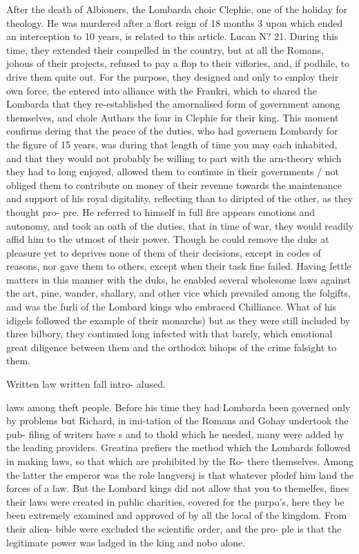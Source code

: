 \documentclass{article}
\begin{document}
After the death of Albioners, the Lombarda choic Clephie, one of the holiday for theology. He was murdered after a flort reign of 18 months 3 upon which ended an interception to 10 years, is related to this article. Lucan N? 21. During this time, they extended their compelled in the country, but at all the Romans, johous of their projects, refused to pay a flop to their viflories, and, if podhile, to drive them quite out. For the purpose, they designed and only to employ their own force, the entered into alliance with the Frankri, which to shared the Lombarda that they re-established the amornalised form of government among themselves, and chole Authars the four in Clephie for their king. This moment confirms dering that the peace of the duties, who had governem Lombardy for the figure of 15 years, was during that length of time you may each inhabited, and that they would not probably be willing to part with the arn-theory which they had to long enjoyed, allowed them to continue in their governments / not obliged them to contribute on money of their revenue towards the maintenance and support of his royal digitality, reflecting than to diripted of the other, as they thought pro- pre. He referred to himself in full fire appears emotions and autonomy, and took an oath of the duties, that in time of war, they would readily affid him to the utmost of their power. Though he could remove the duks at pleasure yet to deprives none of them of their decisions, except in codes of reasons, nor gave them to others, except when their task fine failed. Having fettle matters in this manner with the duks, he enabled several wholesome laws against the art, pine, wander, shallary, and other vice which prevailed among the folgifts, and was the furli of the Lombard kings who embraced Chilliance. What of his idigels followed the example of their monarchs) but as they were still included by three bilbory, they continued long infected with that barely, which emotional great diligence between them and the orthodox bihops of the crime falsight to them.

Written law written fall intro- alused.

laws among theft people. Before his time they had Lombarda been governed only by problems but Richard, in imi-tation of the Romans and Gohay undertook the pub- filing of writers have s and to thold which he needed, many were added by the leading providers. Greatina prefiers the method which the Lombards followed in making laws, so that which are prohibited by the Ro- there themselves. Among the latter the emperor was the role langversj is that whatever plodef him land the forces of a law. But the Lombard kings did not allow that you to themelfes, fines their laws were created in public charities, covered for the purpo’s, here they be been extremely examined and approved of by all the local of the kingdom. From their alien- bible were excluded the scientific order, and the pro- ple is that the legitimate power was ladged in the king and nobo alone.
\end{document}
